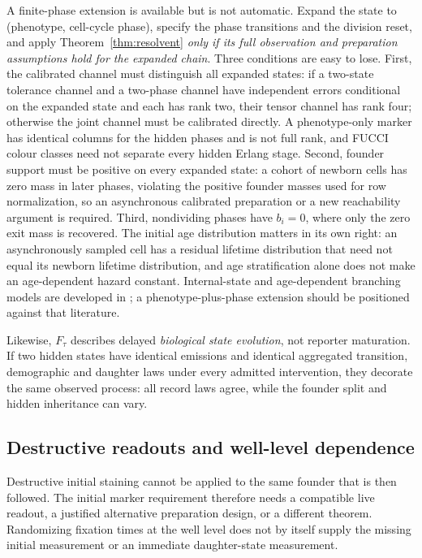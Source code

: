 \documentclass[11pt]{article}
\theoremstyle{definition}
\begin{document}
A finite-phase extension is available but is not automatic. Expand the state to
(phenotype, cell-cycle phase), specify the phase transitions and the division
reset, and apply Theorem~\ref{thm:resolvent} \emph{only if its full observation
and preparation assumptions hold for the expanded chain}. Three conditions are
easy to lose. First, the calibrated channel must distinguish all expanded
states: if a two-state tolerance channel and a two-phase channel have
independent errors conditional on the expanded state and each has rank two, their
tensor channel has rank four; otherwise the joint channel must be calibrated
directly. A phenotype-only marker has identical columns for the hidden phases
and is not full rank, and FUCCI colour classes need not separate every hidden
Erlang stage. Second, founder support must be positive on every expanded state:
a cohort of newborn cells has zero mass in later phases, violating the positive
founder masses used for row normalization, so an asynchronous calibrated
preparation or a new reachability argument is required. Third, nondividing
phases have $b_i=0$, where only the zero exit mass is recovered. The initial age
distribution matters in its own right: an asynchronously sampled cell has a
residual lifetime distribution that need not equal its newborn lifetime
distribution, and age stratification alone does not make an age-dependent hazard
constant. Internal-state and age-dependent branching models are developed in
\citep{gunnarsson2023}; a phenotype-plus-phase extension should be positioned
against that literature.

Likewise, $F_\tau$ describes delayed \emph{biological state evolution}, not
reporter maturation. If two hidden states have identical emissions and identical
aggregated transition, demographic and daughter laws under every admitted
intervention, they decorate the same observed process: all record laws agree,
while the founder split and hidden inheritance can vary.

\subsection{Destructive readouts and well-level dependence}
Destructive initial staining cannot be applied to the same founder that is then
followed. The initial marker requirement therefore needs a compatible live
readout, a justified alternative preparation design, or a different theorem.
Randomizing fixation times at the well level does not by itself supply the
missing initial measurement or an immediate daughter-state measurement.
\end{document}
